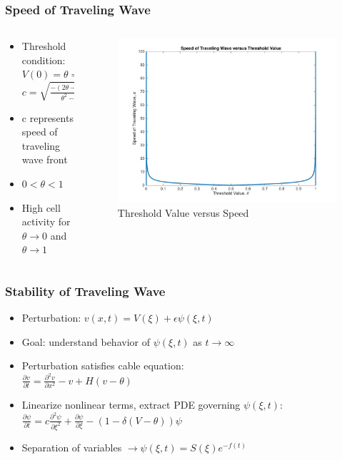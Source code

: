 \documentclass{beamer}
\begin{document}
\begin{frame}
\frametitle{Speed of Traveling Wave}
\begin{columns}
\begin{column}{.5\textwidth}
\begin{itemize}
	\item Threshold condition: $V(0)=\theta \Rightarrow$\\$c=\sqrt{\frac{-(2\theta-1)^2}{\theta^2-\theta}}$
	\item c represents speed of traveling wave front
	\item $0<\theta<1$
	\item High cell activity for $\theta\rightarrow0$ and $\theta\rightarrow1$
\end{itemize}
\end{column}
\begin{column}{.6\textwidth}
\begin{figure}
\includegraphics[scale=0.17]{thresholdSpeed1}
\caption{Threshold Value versus Speed}
\end{figure}
\end{column}
\end{columns}
\end{frame}

\begin{frame}
\frametitle{Stability of Traveling Wave}
\begin{itemize}
	\item Perturbation: $v(x,t)=V(\xi)+\epsilon\psi(\xi,t)$
	\item Goal: understand behavior of $\psi(\xi,t)$ as $t\rightarrow\infty$
	\item Perturbation satisfies cable equation:\\ $\frac{\partial v}{\partial t}=\frac{\partial ^2 v}{\partial x^2}-v+H(v-\theta)$
	\item Linearize nonlinear terms, extract PDE governing $\psi(\xi,t)$:\\
	$\frac{\partial \psi}{\partial t} = c \frac{\partial^2\psi}{\partial\xi^2} + \frac{\partial\psi}{\partial\xi} - (1 - \delta(V-\theta))\psi$
	\item Separation of variables $\rightarrow\psi(\xi,t)=S(\xi)e^{-f(t)}$
\end{itemize}
\end{frame}
\end{document}
